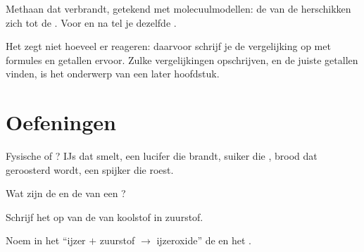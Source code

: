 \begin{omfigure}
{\small Methaan dat verbrandt, getekend met molecuulmodellen: de 
van de  herschikken zich tot de . Voor en na
tel je dezelfde .}
\end{omfigure}

\begin{remark}\label{rem:g7:chemical-reactions:counting}
Het  zegt niet hoeveel  er reageren: daarvoor
schrijf je de vergelijking op met formules en getallen ervoor. Zulke
vergelijkingen opschrijven, en de juiste getallen vinden, is het
onderwerp van een later hoofdstuk.
\end{remark}

\section{Oefeningen}

\begin{exercise}[$\star$]\label{exo:g7:chemical-reactions:1}
Fysische of ? IJs dat smelt, een lucifer die
brandt, suiker die , brood dat geroosterd wordt, een spijker die
roest.
\end{exercise}

\begin{exercise}[$\star$]\label{exo:g7:chemical-reactions:2}
Wat zijn de  en de  van een ?
\end{exercise}

\begin{exercise}[$\star$]\label{exo:g7:chemical-reactions:3}
Schrijf het  op van de  van koolstof in
zuurstof.
\end{exercise}

\begin{exercise}[$\star$]\label{exo:g7:chemical-reactions:4}
Noem in het  ``ijzer $+$ zuurstof $\longrightarrow$
ijzeroxide'' de  en het .
\end{exercise}

